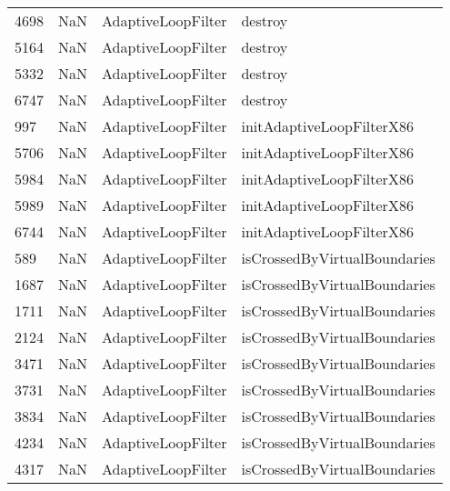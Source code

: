 \begin{tabular}{llll}
4698 &                   NaN &         AdaptiveLoopFilter &                                   destroy \\
5164 &                   NaN &         AdaptiveLoopFilter &                                   destroy \\
5332 &                   NaN &         AdaptiveLoopFilter &                                   destroy \\
6747 &                   NaN &         AdaptiveLoopFilter &                                   destroy \\
997  &                   NaN &         AdaptiveLoopFilter &                 initAdaptiveLoopFilterX86 \\
5706 &                   NaN &         AdaptiveLoopFilter &                 initAdaptiveLoopFilterX86 \\
5984 &                   NaN &         AdaptiveLoopFilter &                 initAdaptiveLoopFilterX86 \\
5989 &                   NaN &         AdaptiveLoopFilter &                 initAdaptiveLoopFilterX86 \\
6744 &                   NaN &         AdaptiveLoopFilter &                 initAdaptiveLoopFilterX86 \\
589  &                   NaN &         AdaptiveLoopFilter &              isCrossedByVirtualBoundaries \\
1687 &                   NaN &         AdaptiveLoopFilter &              isCrossedByVirtualBoundaries \\
1711 &                   NaN &         AdaptiveLoopFilter &              isCrossedByVirtualBoundaries \\
2124 &                   NaN &         AdaptiveLoopFilter &              isCrossedByVirtualBoundaries \\
3471 &                   NaN &         AdaptiveLoopFilter &              isCrossedByVirtualBoundaries \\
3731 &                   NaN &         AdaptiveLoopFilter &              isCrossedByVirtualBoundaries \\
3834 &                   NaN &         AdaptiveLoopFilter &              isCrossedByVirtualBoundaries \\
4234 &                   NaN &         AdaptiveLoopFilter &              isCrossedByVirtualBoundaries \\
4317 &                   NaN &         AdaptiveLoopFilter &              isCrossedByVirtualBoundaries \\

\end{tabular}
